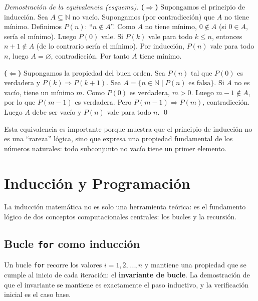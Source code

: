 \documentclass[11pt,a4paper]{article}
\theoremstyle{definition}
\theoremstyle{plain}
\theoremstyle{definition}
\theoremstyle{definition}
\theoremstyle{remark}
\newcommand{\N}{\mathbb{N}}               %
\newcommand{\implica}{\Rightarrow}         %
\begin{document}
\begin{proof}[Demostraci\'on de la equivalencia (esquema)]
\noindent\textbf{($\Rightarrow$)} Supongamos el principio de inducci\'on.
Sea $A \subseteq \N$ no vac\'io. Supongamos (por contradicci\'on) que $A$ no
tiene m\'inimo. Definimos $P(n)$: \enquote{$n \notin A$}. Como $A$ no tiene
m\'inimo, $0 \notin A$ (si $0\in A$, ser\'ia el m\'inimo). Luego $P(0)$ vale.
Si $P(k)$ vale para todo $k \leq n$, entonces $n+1\notin A$ (de lo contrario
ser\'ia el m\'inimo). Por inducci\'on, $P(n)$ vale para todo $n$, luego
$A = \varnothing$, contradicci\'on. Por tanto $A$ tiene m\'inimo.

\noindent\textbf{($\Leftarrow$)} Supongamos la propiedad del buen orden.
Sea $P(n)$ tal que $P(0)$ es verdadera y $P(k) \implica P(k+1)$.
Sea $A = \{ n \in \N \mid P(n) \text{ es falsa} \}$. Si $A$ no es vac\'io,
tiene un m\'inimo $m$. Como $P(0)$ es verdadera, $m > 0$. Luego $m-1 \notin A$,
por lo que $P(m-1)$ es verdadera. Pero $P(m-1) \implica P(m)$, contradicci\'on.
Luego $A$ debe ser vac\'io y $P(n)$ vale para todo $n$.
\qed
\end{proof}

Esta equivalencia es importante porque muestra que el principio de inducci\'on
no es una \enquote{rareza} l\'ogica, sino que expresa una propiedad fundamental
de los n\'umeros naturales: todo subconjunto no vac\'io tiene un primer elemento.

\section{Inducci\'on y Programaci\'on}
\label{sec:programacion}

La inducci\'on matem\'atica no es solo una herramienta te\'orica: es el
fundamento l\'ogico de dos conceptos computacionales centrales:
los bucles y la recursi\'on.

\subsection{Bucle \texttt{for} como inducci\'on}

Un bucle \texttt{for} recorre los valores $i = 1, 2, \dots, n$ y mantiene una
propiedad que se cumple al inicio de cada iteraci\'on: el
\textbf{invariante de bucle}. La demostraci\'on de que el invariante se
mantiene es exactamente el paso inductivo, y la verificaci\'on inicial es el
caso base.
\end{document}
